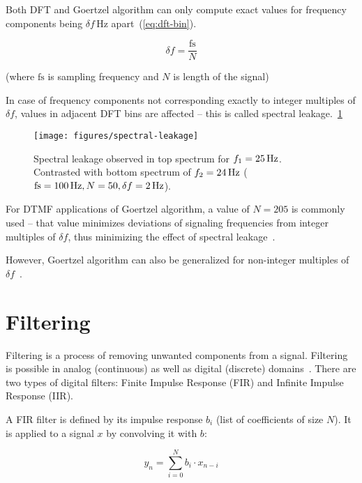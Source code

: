 Both DFT and Goertzel algorithm can only compute exact values for frequency components being $\delta f$\,Hz apart~(\ref{eq:dft-bin}).

\begin{equation}
\label{eq:dft-bin}
\delta f = \frac{\textrm{fs}}{N}
\end{equation}

(where $\textrm{fs}$ is sampling frequency and $N$ is length of the signal)

In case of frequency components not corresponding exactly to integer multiples of $\delta f$, values in adjacent DFT bins are affected -- this is called spectral leakage.~\ref{fig:spectral-leakage}

\begin{figure}[H]
  \centering
  \texttt{[image: figures/spectral-leakage]}
  \caption[Spectral leakage in magnitude spectrum]{Spectral leakage observed in top spectrum for $f_{1} = \textrm{25\,Hz}$. Contrasted with bottom spectrum of $f_{2} = \textrm{24\,Hz}$ ($\textrm{fs} = \textrm{100\,Hz}, N = 50, \delta f = \textrm{2\,Hz}$).}
  \label{fig:spectral-leakage}
\end{figure}

For DTMF applications of Goertzel algorithm, a value of $N = 205$ is commonly used -- that value minimizes deviations of signaling frequencies from integer multiples of $\delta f$, thus minimizing the effect of spectral leakage~\cite{DTMF}.

However, Goertzel algorithm can also be generalized for non-integer multiples of $\delta f$~\cite{PS12}.

\section{Filtering}

Filtering is a process of removing unwanted components from a signal. Filtering is possible in analog (continuous) as well as digital (discrete) domains~\cite{DSPGuide}.
There are two types of digital filters: Finite Impulse Response (FIR) and Infinite Impulse Response (IIR).

A FIR filter is defined by its impulse response $b_i$ (list of coefficients of size $N$). It is applied to a signal $x$ by convolving it with $b$:

\begin{equation}
y_{n} = \sum_{i = 0}^{N} b_{i}\cdot x_{n-i}
\end{equation}

